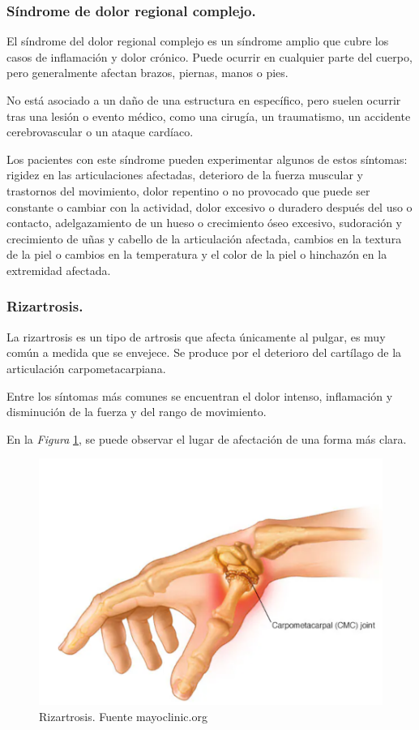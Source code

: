 \subsubsection{Síndrome de dolor regional complejo.}
El síndrome del dolor regional complejo es un síndrome amplio que cubre los casos de inflamación y dolor crónico. Puede ocurrir en cualquier parte del cuerpo, pero generalmente afectan brazos, piernas, manos o pies.  \cite{sindrome_regional_comple}

No está asociado a un daño de una estructura en específico, pero suelen ocurrir tras una lesión o evento médico, como una cirugía, un traumatismo, un accidente cerebrovascular o un ataque cardíaco. \cite{sindrome_regional_comple}

Los pacientes con este síndrome pueden experimentar algunos de estos síntomas: rigidez en las articulaciones afectadas, deterioro de la fuerza muscular y trastornos del movimiento, dolor repentino o no provocado que puede ser constante o cambiar con la actividad, dolor excesivo o duradero después del uso o contacto, adelgazamiento de un hueso o crecimiento óseo excesivo, sudoración y crecimiento de uñas y cabello de la articulación afectada, cambios en la textura de la piel o cambios en la temperatura y el color de la piel o hinchazón en la extremidad afectada. \cite{sindrome_regional_comple}

\subsubsection{Rizartrosis.}
La rizartrosis es un tipo de artrosis que afecta únicamente al pulgar, es muy común a medida que se envejece. Se produce por el deterioro del cartílago de la articulación carpometacarpiana.

Entre los síntomas más comunes se encuentran el dolor intenso, inflamación y disminución de la fuerza y del rango de movimiento.\cite{artritis_pulgar}

En la \textit{Figura} \ref{fig: Rizartrosis}, se puede observar el lugar de afectación de una forma más clara.

\begin{figure}
    \centering
    \includegraphics[width=0.5\linewidth]{img/Rizartrosis.png}
    \caption{Rizartrosis. Fuente mayoclinic.org}
    \label{fig: Rizartrosis}
\end{figure}
